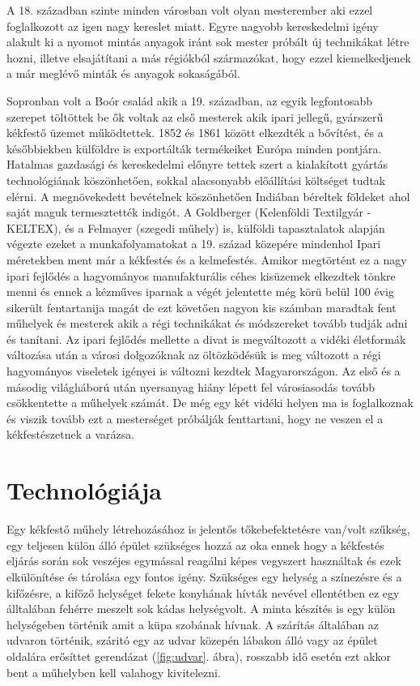 \documentclass[fontsize=12pt, appendixprefix=true]{scrreprt}
\begin{document}
A 18. században szinte minden városban volt olyan mesterember aki ezzel foglalkozott az igen nagy kereslet miatt. Egyre nagyobb kereskedelmi igény alakult ki a nyomot mintás anyagok iránt sok mester próbált új technikákat létre hozni, illetve  elsajátítani a más régiókból származókat, hogy ezzel kiemelkedjenek a már meglévő minták és anyagok sokaságából.

Sopronban volt a Boór család akik a 19. században, az egyik legfontosabb szerepet töltöttek be ők voltak az első mesterek akik ipari jellegű, gyárszerű  kékfestő üzemet működtettek.
1852 és 1861 között elkezdték a bővítést, és a későbbiekben külföldre is exportálták termékeiket Európa minden pontjára. Hatalmas gazdasági és kereskedelmi előnyre tettek szert a kialakított gyártás technológiának köszönhetően, sokkal alacsonyabb előállítási költséget tudtak elérni. A megnövekedett bevételnek köszönhetően Indiában béreltek földeket ahol saját maguk termesztették indigót.
A Goldberger (Kelenföldi Textilgyár - KELTEX), és a Felmayer (szegedi műhely) is, külföldi tapasztalatok alapján végezte ezeket a  munkafolyamatokat a 19. század közepére mindenhol Ipari méretekben ment már a kékfestés és a kelmefestés.
Amikor megtörtént ez a nagy ipari fejlődés a hagyományos manufakturális céhes kisüzemek elkezdtek tönkre menni és ennek a kézműves iparnak a végét jelentette még körü belül 100 évig sikerült fentartanija magát de ezt követően nagyon kis számban maradtak fent műhelyek és mesterek akik a régi technikákat és módszereket tovább tudják adni és tanítani.
Az ipari fejlődés mellette a divat is megváltozott a vidéki életformák változása után a városi dolgozóknak az öltözködésük is meg változott a régi hagyományos viseletek igényei is változni kezdtek Magyarországon.
Az első és a másodig világháború után nyersanyag hiány lépett fel városiasodás tovább csökkentette a műhelyek számát.
De még egy két vidéki helyen ma is foglalkoznak és viszik tovább ezt a mesterséget próbálják fenttartani, hogy ne veszen el a kékfestészetnek a varázsa.

\section{Technológiája}
Egy kékfestő műhely létrehozásához is jelentős tőkebefektetésre van/volt szűkség, egy teljesen külön álló épület szükséges hozzá az oka ennek hogy a kékfestés eljárás során sok veszéjes egymással reagálni képes vegyszert használtak és ezek elkülönítése és tárolása egy fontos igény. Szükséges egy helység a színezésre és a kifőzésre, a  kifőző helységet fekete konyhának hívták nevével ellentétben ez egy álltalában fehérre meszelt sok kádas helységvolt. A minta készítés is egy külön helységeben történik amit a küpa szobának hívnak. A szárítás általában az udvaron történik, száritó egy az udvar közepén lábakon álló vagy az épület oldalára erősíttet gerendázat (\ref{fig:udvar}. ábra), rosszabb idő esetén ezt akkor bent a műhelyben  kell valahogy kivitelezni.
\end{document}
